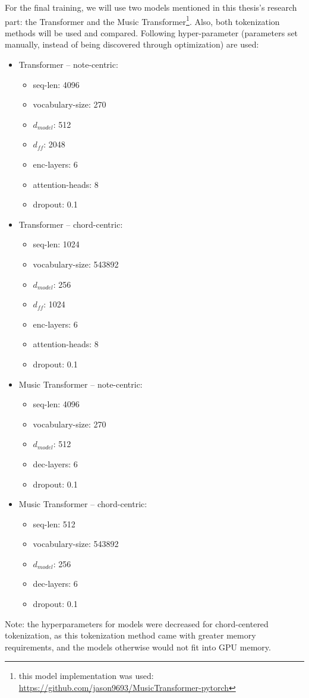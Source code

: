 For the final training, we will use two models mentioned in this thesis's research part: the Transformer and the Music Transformer\footnote{this model implementation was used: \url{https://github.com/jason9693/MusicTransformer-pytorch}}.
Also, both tokenization methods will be used and compared.
Following hyper-parameter (parameters set manually, instead of being discovered through optimization) are used:
\begin{itemize}
    \item Transformer – note-centric:
    \begin{itemize}
        \item seq-len: 4096
        \item vocabulary-size: 270
        \item $d_{model}$: 512
        \item $d_{ff}$: 2048
        \item enc-layers: 6
        \item attention-heads: 8
        \item dropout: 0.1
    \end{itemize}
    \item Transformer – chord-centric:
    \begin{itemize}
        \item seq-len: 1024
        \item vocabulary-size: 543892
        \item $d_{model}$: 256
        \item $d_{ff}$: 1024
        \item enc-layers: 6
        \item attention-heads: 8
        \item dropout: 0.1
    \end{itemize}
    \item Music Transformer – note-centric:
    \begin{itemize}
        \item seq-len: 4096
        \item vocabulary-size: 270
        \item $d_{model}$: 512
        \item dec-layers: 6
        \item dropout: 0.1
    \end{itemize}
    \item Music Transformer – chord-centric:
    \begin{itemize}
        \item seq-len: 512
        \item vocabulary-size: 543892
        \item $d_{model}$: 256
        \item dec-layers: 6
        \item dropout: 0.1
    \end{itemize}
\end{itemize}
Note: the hyperparameters for models were decreased for chord-centered tokenization, as this tokenization method came with greater memory requirements, and the models otherwise would not fit into GPU memory.

